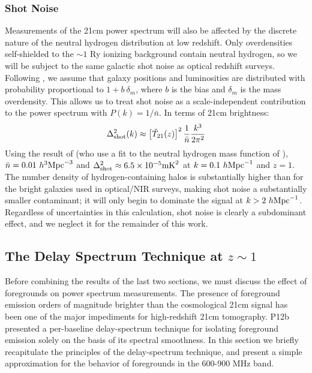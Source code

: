 \documentclass[10pt,iop]{emulateapj}
\begin{document}
\subsubsection{Shot Noise}
\label{sec:shot_noise}

Measurements of the 21cm power spectrum will also be affected by the discrete nature of
the neutral hydrogen distribution at low redshift.  Only overdensities self-shielded to the $\sim1$ Ry ionizing background
contain neutral hydrogen, so we will be subject to the same galactic shot noise as
optical redshift surveys.  Following \citet{seo_et_al_2010}, we assume that galaxy
positions and luminosities are distributed with probability proportional to
$1+b~\delta_m$, where $b$ is the bias and $\delta_m$ is the mass overdensity.  This allows
us to treat shot noise as a scale-independent contribution to the power spectrum
with $P(k) = 1/\bar{n}$.  In terms of 21cm brightness:
\begin{align}
\Delta^2_{\rm shot}(k) \approx \left[\tilde{T}_{21}(z)\right]^2 \frac{1}{\bar{n}} \frac{k^3}{2\pi^2}
\end{align}
Using the result of \citet{seo_et_al_2010} (who use a fit to the neutral hydrogen mass
function of \citealt{zwaan_et_al_2005}), $\bar{n} = 0.01~h^{3}\rm{Mpc}^{-3}$ and 
$\Delta^2_{\rm shot} \approx 6.5 \times 10^{-5} \rm{mK}^2$ at $k = 0.1~h\rm{Mpc}^{-1}$ and 
$z = 1$.  The number density of hydrogen-containing halos is substantially higher than for
the bright galaxies used in optical/NIR surveys, making shot noise a substantially smaller 
contaminant; it will only begin to dominate the signal
at $k > 2~h\rm{Mpc}^{-1}$.
Regardless of uncertainties in this calculation, shot noise is clearly
a subdominant effect, and we neglect it for the remainder of this work.

\subsection{The Delay Spectrum Technique at $z\sim 1$}
\label{sec:dspec}

Before combining the results of the last two sections, we must discuss the effect of
foregrounds on power spectrum measurements.  The presence of foreground emission orders
of magnitude brighter than the cosmological 21cm signal has been one of the major impediments
for high-redshift 21cm tomography.  P12b presented a per-baseline delay-spectrum
technique for isolating foreground emission solely on the basis of its spectral smoothness.
In this section we briefly recapitulate the principles of the delay-spectrum technique, and present
a simple approximation for the behavior of foregrounds in the 600-900 MHz band.
\end{document}
